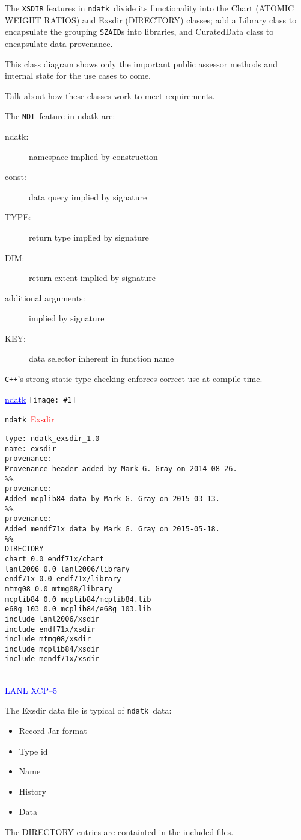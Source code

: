 \documentclass[clock]{slides}
\newenvironment{xslide}[1][logo.jpg]{\begin{slide} \tiny
\textcolor{blue}{\underline{ndatk}} \hfill
\texttt{[image: \#1]}
\normalsize}{\vfill\tiny
\textcolor{blue}{\hrulefill \\LANL XCP--5}
\end{slide}}
\newcommand{\ndatk}{\texttt{ndatk}}
\newcommand{\NDI}{\texttt{NDI}}
\newcommand{\zaid}{\texttt{SZAID}}
\begin{document}
\begin{note}\small
The \texttt{XSDIR} features in \ndatk\ divide its functionality into
the Chart (ATOMIC WEIGHT RATIOS) and Exsdir (DIRECTORY) classes; add a
Library class to encapsulate the grouping \zaid s into libraries, and
CuratedData class to encapsulate data provenance.

This class diagram shows only the important public assessor methods
and internal state for the use cases to come.

Talk about how these classes work to meet requirements.

The \NDI\ feature in ndatk are:
\begin{description}
\item[ndatk: ] namespace implied by construction
\item[const: ] data query implied by signature
\item[TYPE: ] return type implied by signature
\item[DIM: ] return extent implied by signature
\item[additional arguments: ] implied by signature
\item[KEY: ] data selector inherent in function name
\end{description}
\texttt{C++}'s strong static type checking enforces correct use at
compile time.
\end{note}

\begin{xslide}
\begin{center}\Large
\ndatk\ \textcolor{red}{Exsdir}
\end{center}
\small
\begin{verbatim}
type: ndatk_exsdir_1.0
name: exsdir
provenance:
Provenance header added by Mark G. Gray on 2014-08-26.
%%
provenance:
Added mcplib84 data by Mark G. Gray on 2015-03-13.
%%
provenance:
Added mendf71x data by Mark G. Gray on 2015-05-18.
%%
DIRECTORY
chart 0.0 endf71x/chart
lanl2006 0.0 lanl2006/library
endf71x 0.0 endf71x/library
mtmg08 0.0 mtmg08/library
mcplib84 0.0 mcplib84/mcplib84.lib
e68g_103 0.0 mcplib84/e68g_103.lib
include lanl2006/xsdir
include endf71x/xsdir
include mtmg08/xsdir
include mcplib84/xsdir
include mendf71x/xsdir
\end{verbatim}
\end{xslide}

\begin{note}\small

The Exsdir data file is typical of \ndatk\ data:
\begin{itemize}
\item Record-Jar format
\item Type id
\item Name
\item History
\item Data
\end{itemize}

The DIRECTORY entries are containted in the included files.

\end{note}
\end{document}
